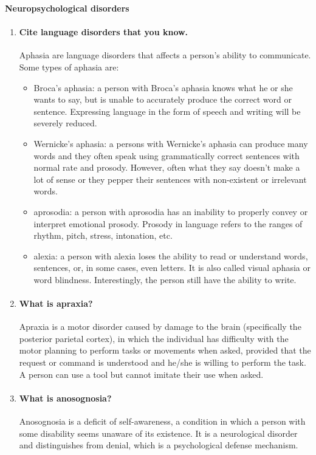 \documentclass[12pt,article,oneside,a4paper]{memoir}
\begin{document}
\textbf{Neuropsychological disorders}\\
\begin{enumerate}
\item \paragraph{Cite language disorders that you know.}
Aphasia are language disorders that affects a person's ability to communicate.
Some types of aphasia are:
\begin{itemize}
\item Broca's aphasia: a person with Broca's aphasia knows what he or she wants
to say, but is unable to accurately produce the correct word or sentence.
Expressing language in the form of speech and writing will be severely reduced.
\item Wernicke's aphasia: a persons with Wernicke's aphasia can produce many
words and they often speak using grammatically correct sentences with normal
rate and prosody. However, often what they say doesn’t make a lot of sense or
they pepper their sentences with non-existent or irrelevant words.
\item aprosodia: a person with aprosodia has an inability to properly convey or
interpret emotional prosody. Prosody in language refers to the ranges of
rhythm, pitch, stress, intonation, etc. 
\item alexia: a person with alexia loses the ability to read or understand
words, sentences, or, in some cases, even letters. It is also called visual
aphasia or word blindness. Interestingly, the person still have the ability to
write.
\end{itemize}

\item \paragraph{What is apraxia?}
Apraxia is a motor disorder caused by damage to the brain (specifically the
posterior parietal cortex), in which the individual has difficulty with the
motor planning to perform tasks or movements when asked, provided that the
request or command is understood and he/she is willing to perform the task.
A person can use a tool but cannot imitate their use when asked.

\item \paragraph{What is anosognosia?}
Anosognosia is a deficit of self-awareness, a condition in which a person with
some disability seems unaware of its existence. It is a neurological disorder
and distinguishes from denial, which is a psychological defense mechanism.
 
\end{enumerate}
\end{document}
